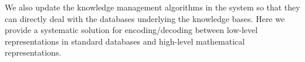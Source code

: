 We also update the knowledge management algorithms in the \mmt system so that they can directly deal with the databases underlying the knowledge bases.
Here we provide a systematic solution for encoding/decoding between low-level representations in standard databases and high-level mathematical representations.


